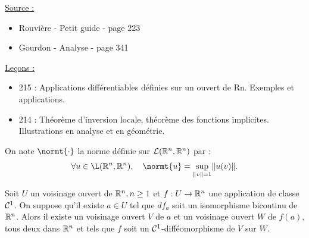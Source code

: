 
\newcommand{\Bfr}{\widebar{B_r}}

\pagestyle{fancy}

\fancyhead[C]{}
\fancyhead[R]{}



\underline{Source :} 
\begin{itemize}
\item Rouvière - Petit guide - page 223
\item Gourdon - Analyse - page 341
\end{itemize}

\underline{Leçons :}
\begin{itemize}
\item 215 : Applications différentiables définies sur un ouvert de Rn. Exemples et applications.
\item 214 : Théorème d’inversion locale, théorème des fonctions implicites. Illustrations en analyse et en géométrie.
\end{itemize}

\begin{nota}
On note $\normt{\cdot}$ la norme définie sur $\mathcal{L}(\mathbb{R}^n, \mathbb{R}^n)$ par :
\[ \forall u \in \L(\R^n, \R^n), \quad \normt{u} = \sup_{\norm{v}=1} \norm{u(v)} . \]
\end{nota}

\begin{thm}
Soit $U$ un voisinage ouvert de $\mathbb{R}^n, n \geq 1$ et $f:U \to \mathbb{R}^n$ une application de classe $\mathcal{C}^1$.
On suppose qu'il existe $a \in U$ tel que $df_a$ soit un isomorphisme bicontinu de $\mathbb{R}^n$.
Alors il existe un voisinage ouvert $V$ de $a$ et un voisinage ouvert $W$ de $f(a)$, tous deux dans $\mathbb{R}^n$ 
et tels que $f$ soit un $\mathcal{C}^1$-difféomorphisme de $V$ sur $W$.
\end{thm}

